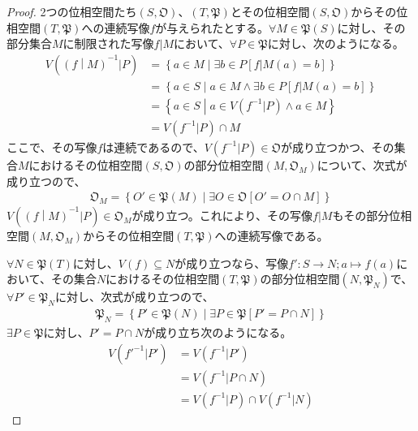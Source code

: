 \documentclass[dvipdfmx]{jsarticle}
\begin{document}
\begin{proof}
2つの位相空間たち$\left( S,\mathfrak{O} \right)$、$\left( T,\mathfrak{P} \right)$とその位相空間$\left( S,\mathfrak{O} \right)$からその位相空間$\left( T,\mathfrak{P} \right)$への連続写像$f$が与えられたとする。$\forall M \in \mathfrak{P}(S)$に対し、その部分集合$M$に制限された写像$f|M$において、$\forall P \in \mathfrak{P}$に対し、次のようになる。
\begin{align*}
V\left( \left( f \middle| M \right)^{- 1}|P \right) &= \left\{ a \in M \middle| \exists b \in P\left[ f|M(a) = b \right] \right\}\\
&= \left\{ a \in S \middle| a \in M \land \exists b \in P\left[ f|M(a) = b \right] \right\}\\
&= \left\{ a \in S \middle| a \in V\left( f^{- 1}|P \right) \land a \in M \right\}\\
&= V\left( f^{- 1}|P \right) \cap M
\end{align*}
ここで、その写像$f$は連続であるので、$V\left( f^{- 1}|P \right)\in \mathfrak{O}$が成り立つかつ、その集合$M$におけるその位相空間$\left( S,\mathfrak{O} \right)$の部分位相空間$\left( M,\mathfrak{O}_{M} \right)$について、次式が成り立つので、
\begin{align*}
\mathfrak{O}_{M} = \left\{ O'\in \mathfrak{P}(M) \middle| \exists O \in \mathfrak{O}\left[ O' = O \cap M \right] \right\}
\end{align*}
$V\left( \left( f \middle| M \right)^{- 1}|P \right) \in \mathfrak{O}_{M}$が成り立つ。これにより、その写像$f|M$もその部分位相空間$\left( M,\mathfrak{O}_{M} \right)$からその位相空間$\left( T,\mathfrak{P} \right)$への連続写像である。\par
$\forall N \in \mathfrak{P}(T)$に対し、$V(f) \subseteq N$が成り立つなら、写像$f':S \rightarrow N;a \mapsto f(a)$において、その集合$N$におけるその位相空間$\left( T,\mathfrak{P} \right)$の部分位相空間$\left( N,\mathfrak{P}_{N} \right)$で、$\forall P' \in \mathfrak{P}_{N}$に対し、次式が成り立つので、
\begin{align*}
\mathfrak{P}_{N} = \left\{ P'\in \mathfrak{P}(N) \middle| \exists P \in \mathfrak{P}\left[ P' = P \cap N \right] \right\}
\end{align*}
$\exists P \in \mathfrak{P}$に対し、$P' = P \cap N$が成り立ち次のようになる。
\begin{align*}
V\left( {f'}^{- 1}|P' \right) &= V\left( f^{- 1}|P' \right)\\
&= V\left( f^{- 1}|P \cap N \right)\\
&= V\left( f^{- 1}|P \right) \cap V\left( f^{- 1}|N \right)

\end{align*}
\end{proof}
\end{document}
